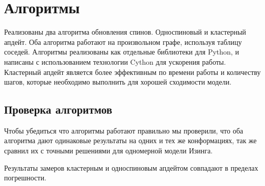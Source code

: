 \section{Алгоритмы}

Реализованы два алгоритма обновления спинов. Односпиновый и кластерный апдейт. Оба алгоритма работают на произвольном графе, используя таблицу соседей. Алгоритмы реализованы как отдельные библиотеки для Python, и написаны с использованием технологии Cython для ускорения работы. Кластерный апдейт является более эффективным по времени работы и количеству шагов, которые необходимо выполнить для хорошей сходимости модели.

\subsection{Проверка алгоритмов}

Чтобы убедиться что алгоритмы работают правильно мы проверили, что оба алгоритма дают одинаковые результаты на одних и тех же конформациях, так же сравнил их с точными решениями для одномерной модели Изинга.

Результаты замеров кластерным и односпиновым апдейтом совпадают в пределах погрешности.

